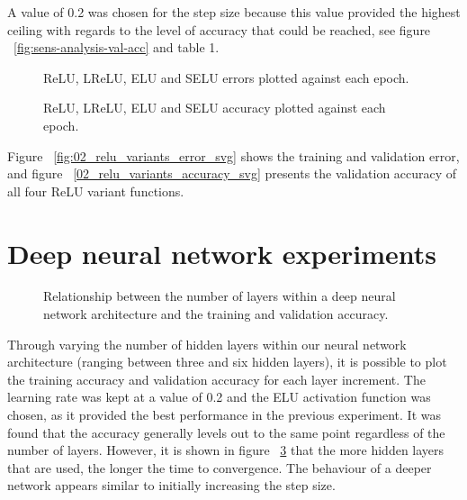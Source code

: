\documentclass{article}
\begin{document}
A value of 0.2 was chosen for the step size because this value provided the highest ceiling with regards to the level of accuracy that could be reached, see figure ~\ref{fig:sens-analysis-val-acc} and table 1.

\begin{figure}[tb]
\vskip 5mm
\begin{center}
\centerline{}
\caption{ReLU, LReLU, ELU and SELU errors plotted against each epoch.}
\label{fig:relu-variants-error}
\end{center}
\vskip -5mm
\end{figure}

\begin{figure}[tb]
\vskip 5mm
\begin{center}
\centerline{}
\caption{ReLU, LReLU, ELU and SELU accuracy plotted against each epoch.}
\label{fig:relu-variants-accuracy}
\end{center}
\vskip -5mm
\end{figure}

Figure ~\ref{fig:02_relu_variants_error_svg} shows the training and validation error, and figure ~\ref{02_relu_variants_accuracy_svg} presents the validation accuracy of all four ReLU variant functions.

\section{Deep neural network experiments}
\label{sec:dnnexpts}

\begin{figure}[tb]
\vskip 5mm
\begin{center}
\centerline{}
\caption{Relationship between the number of layers within a deep neural network architecture and the training and validation accuracy.}
\label{fig:dnn-accuracy}
\end{center}
\vskip -5mm
\end{figure}

Through varying the number of hidden layers within our neural network architecture (ranging between three and six hidden layers), it is possible to plot the training accuracy and validation accuracy for each layer increment. The learning rate was kept at a value of 0.2 and the ELU activation function was chosen, as it provided the best performance in the previous experiment. It was found that the accuracy generally levels out to the same point regardless of the number of layers. However, it is shown in figure ~\ref{fig:dnn-accuracy} that the more hidden layers that are used, the longer the time to convergence. The behaviour of a deeper network appears similar to initially increasing the step size.
\end{document}
